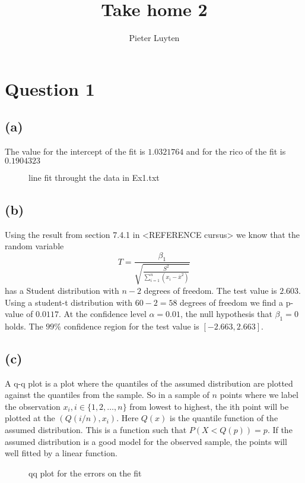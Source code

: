 \documentclass[a4paper]{article}
\title{Take home 2}
\author{Pieter Luyten}
\begin{document}
\maketitle

\section*{Question 1}
\subsection*{(a)}
The value for the intercept of the fit is $1.0321764$ and for the rico of the fit is $0.1904323$
\begin{figure}[h]
	\centering
	
	\caption{line fit throught the data in Ex1.txt}
	\label{fig:fit-1a}
\end{figure}

\subsection*{(b)}
Using the result from section 7.4.1 in <REFERENCE cursus> we know that the random variable
\begin{equation}
	T = \frac{\beta_1}{\sqrt{ \frac{S^2}{ \sum_{i=1}^{n}(x_i-\bar{x}^2)}}}
\end{equation}
has a Student distribution with $n-2$ degrees of freedom. The test value is $2.603$. Using a student-t distribution with $60-2=58$ degrees of freedom we find a p-value of $0.0117$. At the confidence level $\alpha=0.01$, the null hypothesis that $\beta_1=0$ holds. The $99\%$ confidence region for the test value is $[-2.663, 2.663]$.

\subsection*{(c)}
A q-q plot is a plot where the quantiles of the assumed distribution are plotted against the quantiles from the sample. So in a sample of $n$ points where we label the observation $x_i, i \in \{1,2, \ldots, n\}$ from lowest to highest, the ith point will be plotted at the $(Q(i/n), x_i)$. 
Here $Q(x)$ is the quantile function of the assumed distribution. This is a function such that $ P( X < Q(p)) = p$. If the assumed distribution is a good model for the observed sample, the points will well fitted by a linear function.

\begin{figure}[h]
	\centering
	
	\caption{qq plot for the errors on the fit}
	\label{fig:qqplot-1c}
\end{figure}
\end{document}

